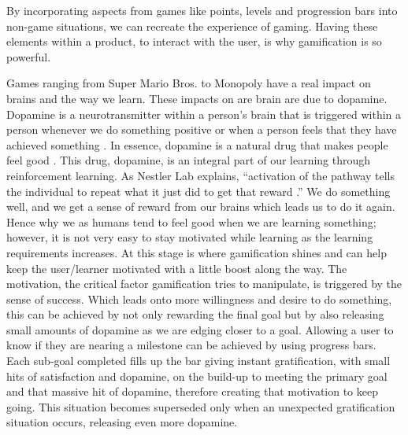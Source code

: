 		By incorporating aspects from games like points, levels and progression bars into non-game situations, we can recreate the experience of gaming. Having these elements within a product, to interact with the user, is why gamification is so powerful.
		
		Games ranging from Super Mario Bros. to Monopoly have a real impact on brains and the way we learn. These impacts on are brain are due to dopamine. Dopamine is a neurotransmitter within a person’s brain that is triggered within a person whenever we do something positive or when a person feels that they have achieved something \cite{dopamine}. In essence, dopamine is a natural drug that makes people feel good \cite{sciencebehind}. This drug, dopamine, is an integral part of our learning through reinforcement learning. As Nestler Lab explains, “activation of the pathway tells the individual to repeat what it just did to get that reward \cite{sciencebehind, brainrewards}.” We do something well, and we get a sense of reward from our brains which leads us to do it again. Hence why we as humans tend to feel good when we are learning something; however, it is not very easy to stay motivated while learning as the learning requirements increases. At this stage is where gamification shines and can help keep the user/learner motivated with a little boost along the way. The motivation, the critical factor gamification tries to manipulate, is triggered by the sense of success. Which leads onto more willingness and desire to do something, this can be achieved by not only rewarding the final goal but by also releasing small amounts of dopamine as we are edging closer to a goal. Allowing a user to know if they are nearing a milestone can be achieved by using progress bars. Each sub-goal completed fills up the bar giving instant gratification, with small hits of satisfaction and dopamine, on the build-up to meeting the primary goal and that massive hit of dopamine, therefore creating that motivation to keep going. This situation becomes superseded only when an unexpected gratification situation occurs, releasing even more dopamine.
		
